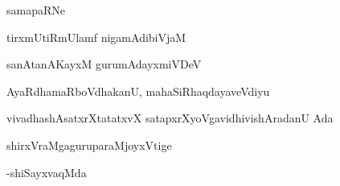 
\begin{center}
{\Large samapaRNe}
\end{center}

\begin{center}
tirxmUtiRmUlamf nigamAdibiVjaM 

sanAtanAKayxM gurumAdayxmiVDeV
\end{center}

\begin{center}
AyaRdhamaRboVdhakanU, mahaSiRhaqdayaveVdiyu

vivadhashAsatxrXtatatxvX  satapxrXyoVgavidhivishAradanU Ada 

shirxVraMgaguruparaMjoyxVtige 
\end{center}

\hfill {-shiSayxvaqMda}


